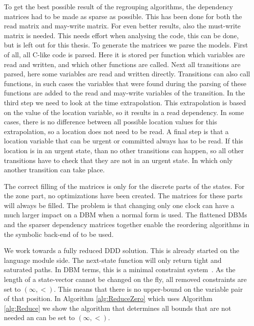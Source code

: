 \label{subsec:matrices}
To get the best possible result of the regrouping algorithms, the dependency matrices had to be made as sparse as possible. This has been done for both the read matrix and may-write matrix. For even better results, also the must-write matrix is needed. This needs effort when analysing the code, this can be done, but is left out for this thesis. To generate the matrices we parse the \uppaal{} models. First of all, all C-like code is parsed. Here it is stored per function which variables are read and written, and which other functions are called. Next all transitions are parsed, here some variables are read and written directly. Transitions can also call functions, in such cases the variables that were found during the parsing of these functions are added to the read and may-write variables of the transition. In the third step we need to look at the time extrapolation. This extrapolation is based on the value of the location variable, so it results in a read dependency. In some cases, there is no difference between all possible location values for this extrapolation, so a location does not need to be read. A final step is that a location variable that can be urgent or committed always has to be read. If this location is in an urgent state, than no other transitions can happen, so all other transitions have to check that they are not in an urgent state. In which only another transition can take place.

The correct filling of the matrices is only for the discrete parts of the states. For the zone part, no optimizations have been created. The matrices for these parts will always be filled. The problem is that changing only one clock can have a much larger impact on a DBM when a normal form is used. The flattened DBMs and the sparser dependency matrices together enable the reordering algorithms in the symbolic back-end of \ltsmin{} to be used.

\label{subsection:dbm_reduction}
We work towards a fully reduced DDD solution. This is already started on the language module side. The next-state function will only return tight and saturated paths. In DBM terms, this is a minimal constraint system~\cite{bengtsson2002clocks}. As the length of a state-vector cannot be changed on the fly, all removed constraints are set to $(\infty,<)$. This means that there is no upper-bound on the variable pair of that position. In Algorithm \ref{alg:ReduceZero} which uses Algorithm \ref{alg:Reduce} we show the algorithm that determines all bounds that are not needed an can be set to $(\infty,<)$. 

